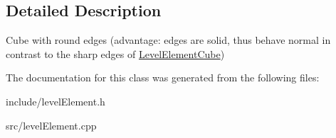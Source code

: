 \subsection{\-Detailed \-Description}
\-Cube with round edges (advantage\-: edges are solid, thus behave normal in contrast to the sharp edges of \hyperlink{classLevelElementCube}{\-Level\-Element\-Cube}) 

\-The documentation for this class was generated from the following files\-:\begin{DoxyCompactItemize}
\item 
include/level\-Element.\-h\item 
src/level\-Element.\-cpp\end{DoxyCompactItemize}

